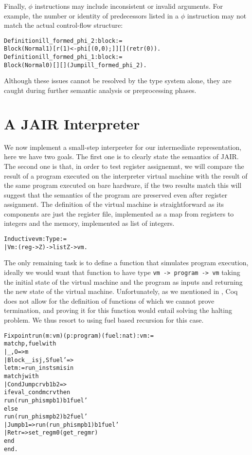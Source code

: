 Finally, $\phi$ instructions may include inconsistent or invalid arguments. For example, the number or identity of predecessors listed in a $\phi$ instruction may not match the actual control-flow structure:

\begin{alltt}
Definition ill_formed_phi_2 : block :=
  Block (Normal 1) [r(1) <- phi [(0, 0);]] [] (ret r(0)).
Definition ill_formed_phi_1 : block :=
  Block (Normal 0) [] [] (Jump ill_formed_phi_2).
\end{alltt}

Although these issues cannot be resolved by the type system alone, they are caught during further semantic analysis or preprocessing phases.

\section{A JAIR Interpreter}
\label{sec:jair-int}

We now implement a small-step interpreter for our intermediate representation, here we have two goals.
The first one is to clearly state the semantics of JAIR. The second one is that, in order to test register assignemnt, we will compare the result of a program executed on the interpreter virtual machine with the result of the same program executed on bare hardware, if the two results match this will suggest that the semantics of the program are preserved even after register assignment.
The definition of the virtual machine is straightforward as its components are just the register file, implemented as a map from registers to integers and the memory, implemented as list of integers.

\begin{alltt}
Inductive vm : Type :=
  | Vm : (reg -> Z) -> list Z -> vm.
\end{alltt}

The only remaining task is to define a function that simulates program execution, ideally we would want that function to have type \texttt{vm -> program -> vm} taking the initial state of the virtual machine and the program as inputs and returning the new state of the virtual machine.
Unfortunately, as we mentioned in , Coq does not allow for the definition of functions of which we cannot prove termination, and proving it for this function would entail solving the halting problem. We thus resort to using fuel based recursion for this case.

\begin{alltt}
Fixpoint run (m : vm) (p : program) (fuel : nat) : vm :=
  match p, fuel with
  | _, O => m
  | Block _ _ is j, S fuel' =>
    let m := run_insts m is in
    match j with
    | CondJump c r v b1 b2 =>
      if eval_cond m c r v then
        run (run_phis m p b1) b1 fuel'
      else
        run (run_phis m p b2) b2 fuel'
    | Jump b1 => run (run_phis m p b1) b1 fuel'
    | Ret r => set_reg m 0 (get_reg m r)
    end
  end.
\end{alltt}

